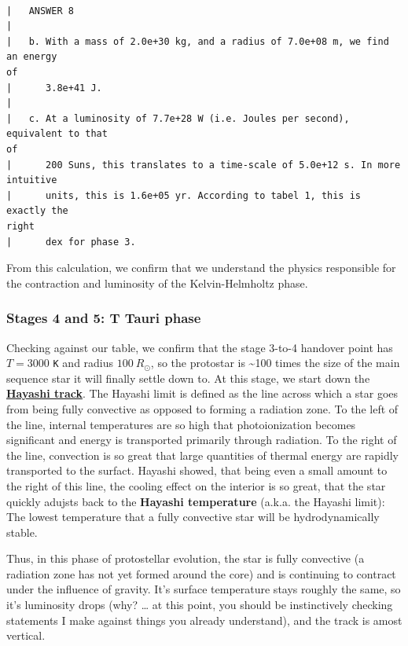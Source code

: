 \documentclass[11pt]{article}
\begin{document}
    \begin{Verbatim}[commandchars=\\\{\}]

|   ANSWER 8
|
|   b. With a mass of 2.0e+30 kg, and a radius of 7.0e+08 m, we find an energy
of
|      3.8e+41 J.
|
|   c. At a luminosity of 7.7e+28 W (i.e. Joules per second), equivalent to that
of
|      200 Suns, this translates to a time-scale of 5.0e+12 s. In more intuitive
|      units, this is 1.6e+05 yr. According to tabel 1, this is exactly the
right
|      dex for phase 3.

    \end{Verbatim}

    From this calculation, we confirm that we understand the physics
responsible for the contraction and luminosity of the Kelvin-Helmholtz
phase.

\subsubsection{Stages 4 and 5: T Tauri
phase}\label{stages-4-and-5-t-tauri-phase}

Checking against our table, we confirm that the stage 3-to-4 handover
point has \(T=3000\) \texttt{K} and radius \(100\ R_\odot\), so the
protostar is \textasciitilde100 times the size of the main sequence star
it will finally settle down to. At this stage, we start down the
\href{https://en.wikipedia.org/wiki/Hayashi_track}{\textbf{Hayashi
track}}. The Hayashi limit is defined as the line across which a star
goes from being fully convective as opposed to forming a radiation zone.
To the left of the line, internal temperatures are so high that
photoionization becomes significant and energy is transported primarily
through radiation. To the right of the line, convection is so great that
large quantities of thermal energy are rapidly transported to the
surfact. Hayashi showed, that being even a small amount to the right of
this line, the cooling effect on the interior is so great, that the star
quickly adujsts back to the \textbf{Hayashi temperature} (a.k.a. the
Hayashi limit): The lowest temperature that a fully convective star will
be hydrodynamically stable.

Thus, in this phase of protostellar evolution, the star is fully
convective (a radiation zone has not yet formed around the core) and is
continuing to contract under the influence of gravity. It's surface
temperature stays roughly the same, so it's luminosity drops (why?
\ldots{} at this point, you should be instinctively checking statements
I make against things you already understand), and the track is amost
vertical.
\end{document}
